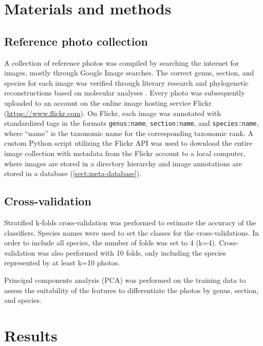 \documentclass[review,3p,twocolumn]{elsarticle}
\begin{document}
\lipsum[1-3]

\section{Materials and methods}
\label{sect:methods}

\subsection{Reference photo collection}

A collection of reference photos was compiled by searching the internet for images, mostly through Google Image searches. The correct genus, section, and species for each image was verified through literary research \citep{Cribb1998, Pridgeon1999, Frosch2012} and phylogenetic reconstructions based on molecular analyses \citep{Li2011, Chochai2012}. Every photo was subsequently uploaded to an account on the online image hosting service Flickr (\url{https://www.flickr.com}). On Flickr, each image was annotated with standardized tags in the formats \texttt{genus:name}, \texttt{section:name}, and \texttt{species:name}, where ``name'' is the taxonomic name for the corresponding taxonomic rank. A custom Python script utilizing the Flickr API was used to download the entire image collection with metadata from the Flickr account to a local computer, where images are stored in a directory hierarchy and image annotations are stored in a database (\ref{sect:meta-database}).

\subsection{Cross-validation}

Stratified k-folds cross-validation was performed to estimate the accuracy of the classifiers. Species names were used to set the classes for the cross-validations. In order to include all species, the number of folds was set to 4 (k=4). Cross-validation was also performed with 10 folds, only including the species represented by at least k=10 photos.

Principal components analysis (PCA) was performed on the training data to assess the suitability of the features to differentiate the photos by genus, section, and species.

\section{Results}
\label{sect:results}
\end{document}
